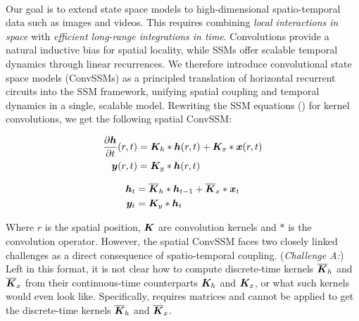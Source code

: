 \documentclass{article}
\begin{document}
\paragraph{}
Our goal is to extend state space models to high-dimensional spatio-temporal data such as images and videos. This requires combining \emph{local interactions in space} with \emph{efficient long-range integrations in time}. Convolutions provide a natural inductive bias for spatial locality, while SSMs offer scalable temporal dynamics through linear recurrences. We therefore introduce convolutional state space models (ConvSSMs) as a principled translation of horizontal recurrent circuits into the SSM framework, unifying spatial coupling and temporal dynamics in a single, scalable model.
%
Rewriting the SSM equations () for kernel convolutions, we get the following spatial ConvSSM:
\begin{minipage}[t]{.45\linewidth}
\vspace{-5mm}
  \begin{subequations}
    \label{eq:conv_ssm_continuous}
    \begin{align}
    \label{eq:conv_ssm_continuous:1}
      \frac{\partial \bm{h}}{\partial t}(r,t) &= \bm{K}_h \ast \bm{h}(r, t) + \bm{K}_x \ast \bm{x}(r, t) \\
      \bm{y}(r, t) &= \bm{K}_y \ast \bm{h}(r, t)
    \end{align}
  \end{subequations}
\vspace{-5mm}
\end{minipage}%
\begin{minipage}[t]{.45\linewidth}
\vspace{-5mm}
  \begin{subequations}
    \label{eq:conv_ssm_discrete}
    \begin{align}
    \label{eq:conv_ssm_discrete:1}
      \bm{h}_{t} &= \overline{\bm{K}}_h \ast \bm{h}_{t-1} + \overline{\bm{K}}_x \ast \bm{x}_t \\
    \label{eq:conv_ssm_discrete:2}
      \bm{y}_t &= \bm{K}_y \ast \bm{h}_t
    \end{align}
  \end{subequations}
\vspace{-5mm}
\end{minipage}
Where $r$ is the spatial position, $\bm{K}$ are convolution kernels and $\ast$ is the convolution operator. However, the spatial ConvSSM faces two closely linked challenges as a direct consequence of spatio-temporal coupling.
%
(\emph{Challenge A:}) Left in this format, it is not clear how to compute discrete-time kernels $\overline{\bm{K}}_h$ and $\overline{\bm{K}}_x$ from their continuous-time counterparts $\bm{K}_h$ and $\bm{K}_x$, or what such kernels would even look like. Specifically,  requires matrices and cannot be applied to get the discrete-time kernels $\overline{\bm{K}}_h$ and $\overline{\bm{K}}_x$.
\end{document}
